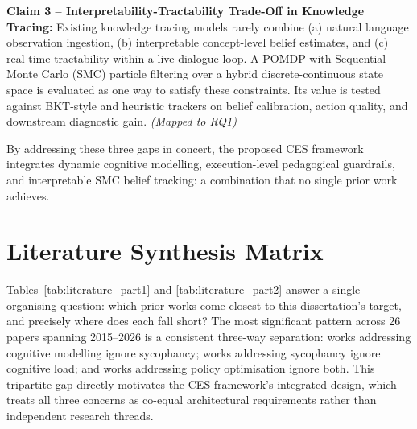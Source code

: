 \documentclass[11pt,a4paper]{report}
\begin{document}
\noindent\textbf{Claim 3 -- Interpretability-Tractability Trade-Off in Knowledge Tracing:} Existing knowledge tracing models rarely combine (a) natural language observation ingestion, (b) interpretable concept-level belief estimates, and (c) real-time tractability within a live dialogue loop. A POMDP with Sequential Monte Carlo (SMC) particle filtering over a hybrid discrete-continuous state space is evaluated as one way to satisfy these constraints. Its value is tested against BKT-style and heuristic trackers on belief calibration, action quality, and downstream diagnostic gain. \textit{(Mapped to RQ1)}

By addressing these three gaps in concert, the proposed CES framework integrates dynamic cognitive modelling, execution-level pedagogical guardrails, and interpretable SMC belief tracking: a combination that no single prior work achieves.

\section{Literature Synthesis Matrix}
Tables~\ref{tab:literature_part1} and \ref{tab:literature_part2} answer a single organising question: which prior works come closest to this dissertation's target, and precisely where does each fall short? The most significant pattern across 26 papers spanning 2015--2026 is a consistent three-way separation: works addressing cognitive modelling ignore sycophancy; works addressing sycophancy ignore cognitive load; and works addressing policy optimisation ignore both. This tripartite gap directly motivates the CES framework's integrated design, which treats all three concerns as co-equal architectural requirements rather than independent research threads.
\end{document}
